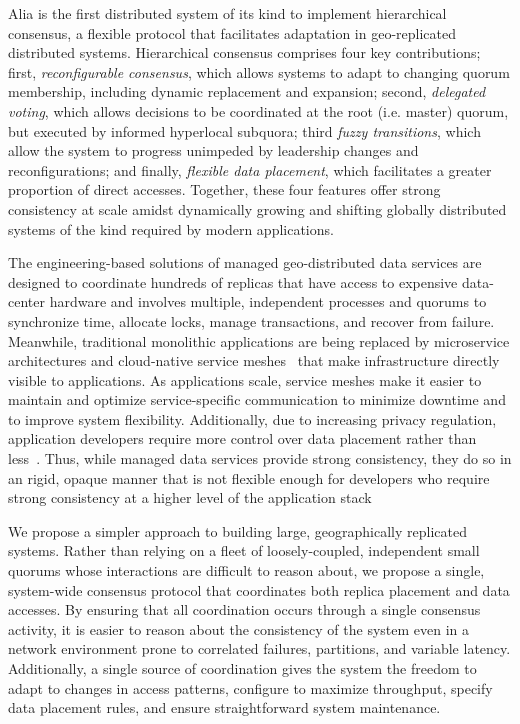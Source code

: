\documentclass[11pt,conference]{IEEEtran}
\begin{document}
Alia is the first distributed system of its kind to implement hierarchical consensus,
a flexible protocol that facilitates adaptation in geo-replicated distributed systems.
Hierarchical consensus comprises four key contributions; first, \emph{reconfigurable
consensus}, which allows systems to adapt to changing quorum membership, including
dynamic replacement and expansion; second, \emph{delegated voting}, which allows
decisions to be coordinated at the root (i.e. master) quorum, but executed by informed
hyperlocal subquora; third \emph{fuzzy transitions}, which allow the system to progress
unimpeded by leadership changes and reconfigurations; and finally, \emph{flexible data
placement}, which facilitates a greater proportion of direct accesses.
Together, these four features offer strong consistency at scale amidst dynamically
growing and shifting globally distributed systems of the kind required by modern
applications.

The engineering-based solutions of managed geo-distributed data services are designed to
coordinate hundreds of replicas that have access to expensive data-center hardware and
involves multiple, independent processes and quorums to synchronize time, allocate locks,
manage transactions, and recover from failure.
Meanwhile, traditional monolithic applications are being replaced by microservice
architectures and cloud-native service meshes~\cite{envoy} that make
infrastructure directly visible to applications.
As applications scale, service meshes make it easier to maintain and optimize
service-specific communication to minimize downtime and to improve system flexibility.
Additionally, due to increasing privacy regulation, application developers require more
control over data placement rather than less~\cite{gdpr}.
Thus, while managed data services provide strong consistency, they do so in an rigid, 
opaque manner that is not flexible enough for developers who require strong consistency
at a higher level of the application stack

We propose a simpler approach to building large, geographically replicated systems.
Rather than relying on a fleet of loosely-coupled, independent small quorums whose
interactions are difficult to reason about, we propose a single, system-wide consensus
protocol that coordinates both replica placement and data accesses.
By ensuring that all coordination occurs through a single consensus activity,
it is easier to reason about the consistency of the system even in a network environment
prone to correlated failures, partitions, and variable latency.
Additionally, a single source of coordination gives the system the freedom to adapt to
changes in access patterns, configure to maximize throughput, specify data placement
rules, and ensure straightforward system maintenance.
\end{document}

